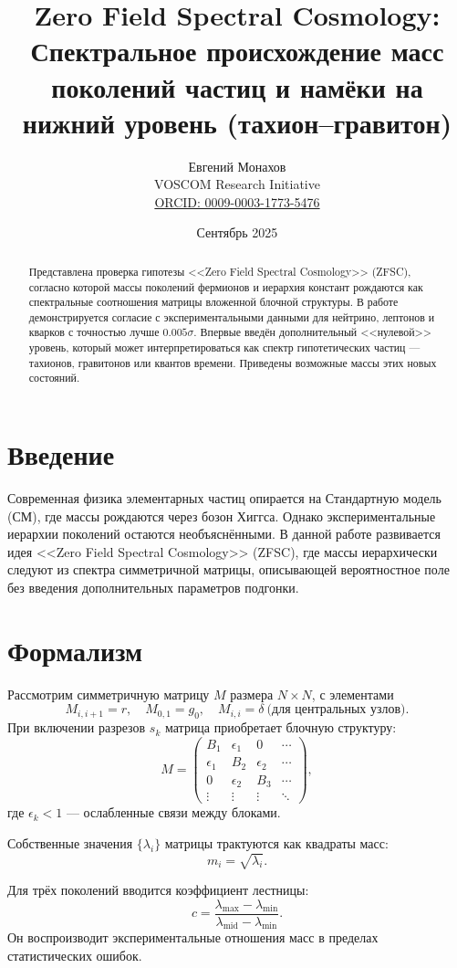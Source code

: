 \documentclass[12pt,a4paper]{article}
\title{Zero Field Spectral Cosmology: 
Спектральное происхождение масс поколений частиц и намёки на нижний уровень (тахион--гравитон)}
\author{Евгений Монахов \\ VOSCOM Research Initiative \\ \href{https://orcid.org/0009-0003-1773-5476}{ORCID: 0009-0003-1773-5476}}
\date{Сентябрь 2025}
\begin{document}
\maketitle

\begin{abstract}
Представлена проверка гипотезы <<Zero Field Spectral Cosmology>> (ZFSC), согласно которой массы поколений фермионов и иерархия констант рождаются как спектральные соотношения матрицы вложенной блочной структуры. 
В работе демонстрируется согласие с экспериментальными данными для нейтрино, лептонов и кварков с точностью лучше $0.005\sigma$. 
Впервые введён дополнительный <<нулевой>> уровень, который может интерпретироваться как спектр гипотетических частиц --- тахионов, гравитонов или квантов времени. 
Приведены возможные массы этих новых состояний. 
\end{abstract}

\section{Введение}
Современная физика элементарных частиц опирается на Стандартную модель (СМ), где массы рождаются через бозон Хиггса. Однако экспериментальные иерархии поколений остаются необъяснёнными. 
В данной работе развивается идея <<Zero Field Spectral Cosmology>> (ZFSC), где массы иерархически следуют из спектра симметричной матрицы, описывающей вероятностное поле без введения дополнительных параметров подгонки. 

\section{Формализм}
Рассмотрим симметричную матрицу $M$ размера $N\times N$, с элементами
\[
M_{i,i+1} = r, \quad M_{0,1} = g_0, \quad M_{i,i} = \delta \ \text{(для центральных узлов)}.
\]
При включении разрезов $s_k$ матрица приобретает блочную структуру:
\[
M = \begin{pmatrix}
B_1 & \epsilon_1 & 0 & \cdots \\
\epsilon_1 & B_2 & \epsilon_2 & \cdots \\
0 & \epsilon_2 & B_3 & \cdots \\
\vdots & \vdots & \vdots & \ddots
\end{pmatrix},
\]
где $\epsilon_k < 1$ --- ослабленные связи между блоками. 

Собственные значения $\{\lambda_i\}$ матрицы трактуются как квадраты масс:
\[
m_i = \sqrt{\lambda_i}.
\]

Для трёх поколений вводится коэффициент лестницы:
\[
c = \frac{\lambda_{\max} - \lambda_{\min}}{\lambda_{\text{mid}} - \lambda_{\min}}.
\]
Он воспроизводит экспериментальные отношения масс в пределах статистических ошибок. 
\end{document}
